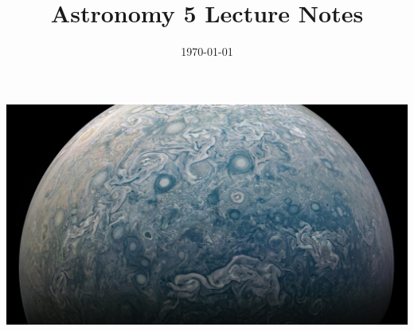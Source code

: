 \documentclass{article}
\date{\today}
\title{Astronomy 5 Lecture Notes}
\begin{document}
    \maketitle
    \thispagestyle{empty}
    \begin{center}
        \includegraphics[width=\textwidth]{jupiter.jpg}
    \end{center}
    \tableofcontents
    \newpage
    
\end{document}
